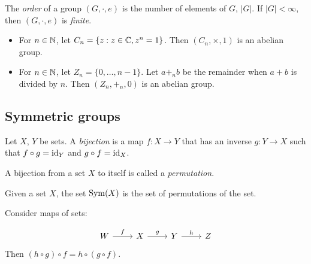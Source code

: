 \documentclass{../template/note}
\begin{document}
    \begin{definition}
        The \emph{order} of a group \((G, \cdot, e)\) is the number of elements of \(G\), \(|G|\). If \(|G| < \infty\), then \((G, \cdot, e)\) is \emph{finite}.
    \end{definition}
    
    \begin{example*}
        \begin{itemize}
            \item For \(n \in \mathbb N\), let \(C_n = \{z: z \in \mathbb C, z^n = 1\}\). Then \((C_n, \times, 1)\) is an abelian group.
            \item For \(n \in \mathbb N\), let \(Z_n = \{0, \dots, n-1\}\). Let \(a +_n b\) be the remainder when \(a + b\) is divided by \(n\). Then \((Z_n, +_n, 0)\) is an abelian group.
        \end{itemize}
        
        
    \end{example*}


    \subsection{Symmetric groups}

    \begin{definition}
        Let \(X\), \(Y\) be sets. A \emph{bijection} is a map \(f: X \to Y\) that has an inverse \(g: Y \to X\) such that \(f \circ g = \operatorname{id}_Y\) and \(g \circ f = \operatorname{id}_X\).
    \end{definition}
    
    \begin{definition}
        A bijection from a set \(X\) to itself is called a \emph{permutation}.
    \end{definition}
    
    \begin{definition}
        Given a set \(X\), the set \(\operatorname{Sym}(X)\) is the set of permutations of the set.
    \end{definition}
    
    \begin{lemma}
        Consider maps of sets:

        \[\begin{tikzcd}
            W & X & Y & Z
            \arrow["f", from=1-1, to=1-2]
            \arrow["g", from=1-2, to=1-3]
            \arrow["h", from=1-3, to=1-4]
        \end{tikzcd}\]
        Then \((h \circ g) \circ f = h \circ (g \circ f)\).
        \label{associativity-of-function-composition}
    \end{lemma}
    
\end{document}
